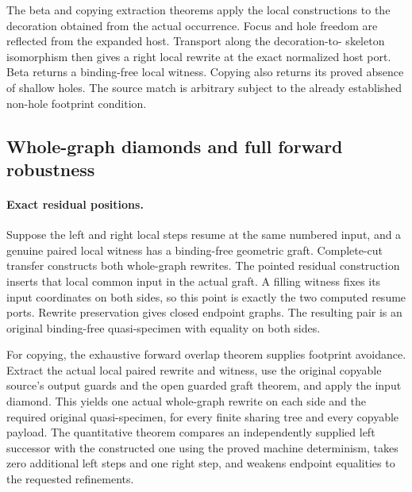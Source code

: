 The beta and copying extraction theorems apply the local constructions to
the decoration obtained from the actual occurrence. Focus and hole freedom
are reflected from the expanded host. Transport along the decoration-to-
skeleton isomorphism then gives a right local rewrite at the exact
normalized host port. Beta returns a binding-free local witness. Copying
also returns its proved absence of shallow holes. The source match is
arbitrary subject to the already established non-hole footprint condition.




\subsection{Whole-graph diamonds and full forward robustness}
\paragraph{Exact residual positions.}
Suppose the left and right local steps resume at the same numbered input,
and a genuine paired local witness has a binding-free geometric graft.
Complete-cut transfer constructs both whole-graph rewrites. The pointed
residual construction inserts that local common input in the actual graft.
A filling witness fixes its input coordinates on both sides, so this point
is exactly the two computed resume ports. Rewrite preservation gives
closed endpoint graphs. The resulting pair is an original binding-free
quasi-specimen with equality on both sides.


For copying, the exhaustive forward overlap theorem supplies footprint
avoidance. Extract the actual local paired rewrite and witness, use the
original copyable source's output guards and the open guarded graft theorem,
and apply the input diamond. This yields one actual whole-graph rewrite on
each side and the required original quasi-specimen, for every finite sharing
tree and every copyable payload. The quantitative theorem compares an
independently supplied left successor with the constructed one using the
proved machine determinism, takes zero additional left steps and one right
step, and weakens endpoint equalities to the requested refinements.

